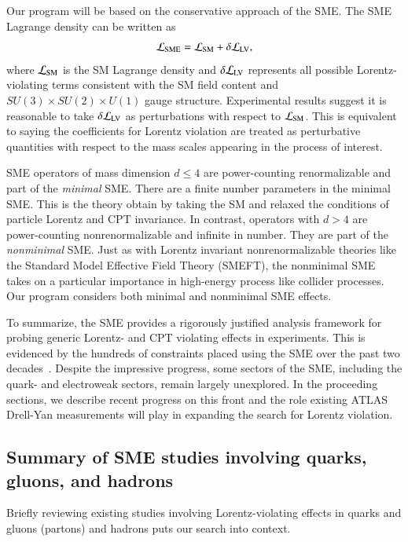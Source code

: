 Our program will be based on the conservative approach of the SME. The SME
Lagrange density can be written as 
%
\begin{equation}
\label{SMEaction}
{\cal L}_{\text{SME}} = {\cal L}_{\text{SM}} + \delta {\cal L}_{\text{LV}},
\end{equation}
%
where ${\cal L}_{\text{SM}}$ is the SM Lagrange density 
and $\delta{\cal L}_{\text{LV}}$ represents all possible 
Lorentz-violating terms consistent with the SM field content and
$SU(3)\times SU(2)\times U(1)$ gauge structure. Experimental results
suggest it is reasonable to take $\delta{\cal L}_{\text{LV}}$ as
perturbations with respect to ${\cal L}_{\text{SM}}$. This is equivalent
to saying the coefficients for Lorentz violation are treated as perturbative
quantities with respect to the mass scales appearing in the process of interest. 

SME operators of mass dimension $d\leq 4$ 
are power-counting renormalizable and part of the \textit{minimal} SME.
There are a finite number parameters in the minimal SME. This is the theory
obtain by taking the SM and relaxed the conditions
of particle Lorentz and CPT invariance.
In contrast, operators with $d>4$ are power-counting nonrenormalizable and infinite
in number. They are part of the \textit{nonminimal} SME. Just as with 
Lorentz invariant nonrenormalizable theories like the Standard Model Effective
Field Theory (SMEFT), the nonminimal SME takes on a particular importance
in high-energy process like collider processes. Our program considers
both minimal and nonminimal SME effects. 

To summarize, the SME provides a rigorously justified
analysis framework for probing
generic Lorentz- and CPT violating effects
in experiments. This is evidenced by the hundreds 
of constraints placed using the SME over the past two decades~\cite{datatables}.
Despite the impressive progress, some
sectors of the SME, including the quark- and electroweak
sectors, remain largely unexplored.
In the proceeding sections, we describe recent progress
on this front and the role existing
ATLAS Drell-Yan measurements will play in expanding the 
search for Lorentz violation.
%
%
\subsection{Summary of SME studies involving quarks, gluons, and hadrons}
\label{ssec:prevstudies}
%
%
Briefly reviewing existing studies involving 
Lorentz-violating effects in quarks and gluons (partons) 
and hadrons puts our search into context.

